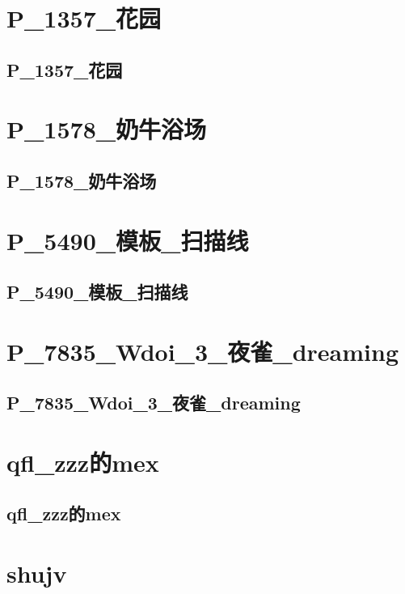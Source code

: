 \section{P_1357_花园}
\subsection{P_1357_花园}
\raggedbottom
\hrulefill

\section{P_1578_奶牛浴场}
\subsection{P_1578_奶牛浴场}
\raggedbottom
\hrulefill

\section{P_5490_模板_扫描线}
\subsection{P_5490_模板_扫描线}
\raggedbottom
\hrulefill

\section{P_7835_Wdoi_3_夜雀_dreaming}
\subsection{P_7835_Wdoi_3_夜雀_dreaming}
\raggedbottom
\hrulefill

\section{qfl_zzz的mex}
\subsection{qfl_zzz的mex}
\raggedbottom
\hrulefill

\section{shujv}
